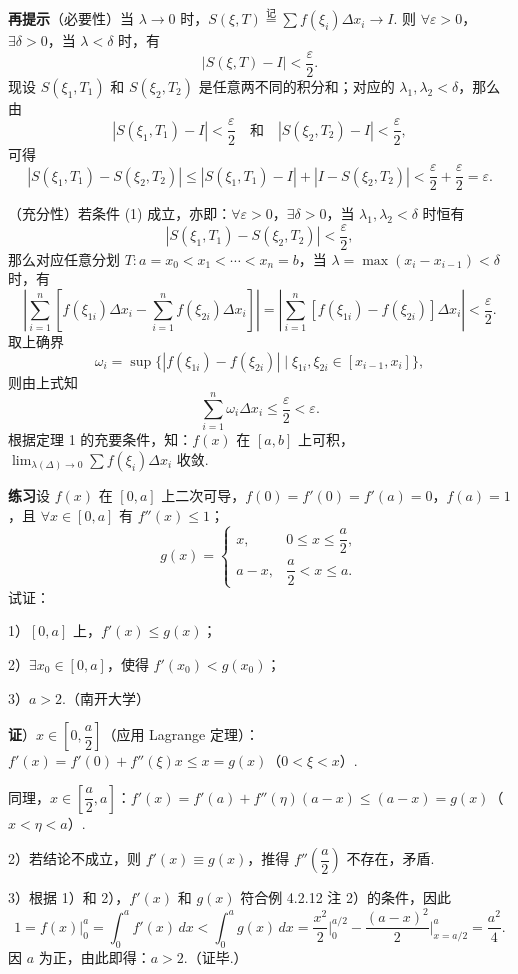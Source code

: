 \documentclass[UTF8,12pt,a4paper,fontset=fandol]{ctexart}
\begin{document}
\noindent\textbf{再提示}\quad （必要性）当 $\lambda\to0$ 时，$S(\xi,T)\stackrel{\text{记}}{=}\sum f(\xi_i)\Delta x_i\to I$. 则 $\forall\varepsilon>0$，$\exists\delta>0$，当 $\lambda<\delta$ 时，有
\[
|S(\xi,T)-I|<\frac{\varepsilon}{2}.
\]
现设 $S(\xi_1,T_1)$ 和 $S(\xi_2,T_2)$ 是任意两不同的积分和；对应的 $\lambda_1,\lambda_2<\delta$，那么由
\[
|S(\xi_1,T_1)-I|<\frac{\varepsilon}{2}\quad\text{和}\quad |S(\xi_2,T_2)-I|<\frac{\varepsilon}{2},
\]
可得
\[
|S(\xi_1,T_1)-S(\xi_2,T_2)|
\le |S(\xi_1,T_1)-I|+|I-S(\xi_2,T_2)|<\frac{\varepsilon}{2}+\frac{\varepsilon}{2}=\varepsilon.
\]

（充分性）若条件 (1) 成立，亦即：$\forall\varepsilon>0$，$\exists\delta>0$，当 $\lambda_1,\lambda_2<\delta$ 时恒有
\[
|S(\xi_1,T_1)-S(\xi_2,T_2)|<\frac{\varepsilon}{2},
\tag{2}
\]
那么对应任意分划 $T:a=x_0<x_1<\cdots<x_n=b$，当 $\lambda=\max(x_i-x_{i-1})<\delta$ 时，有
\[
\left|\sum_{i=1}^n[f(\xi_{1i})\Delta x_i-\sum_{i=1}^n f(\xi_{2i})\Delta x_i]\right|
=\left|\sum_{i=1}^n[f(\xi_{1i})-f(\xi_{2i})]\Delta x_i\right|<\frac{\varepsilon}{2}.
\]
取上确界
\[
\omega_i=\sup\{|f(\xi_{1i})-f(\xi_{2i})|\mid \xi_{1i},\xi_{2i}\in[x_{i-1},x_i]\},
\]
则由上式知
\[
\sum_{i=1}^n\omega_i\Delta x_i\le\frac{\varepsilon}{2}<\varepsilon.
\]
根据定理 1 的充要条件，知：$f(x)$ 在 $[a,b]$ 上可积，$\lim_{\lambda(\Delta)\to0}\sum f(\xi_i)\Delta x_i$ 收敛.

\noindent\textbf{练习}\quad 设 $f(x)$ 在 $[0,a]$ 上二次可导，$f(0)=f'(0)=f'(a)=0$，$f(a)=1$，且 $\forall x\in[0,a]$ 有 $f''(x)\le1$；
\[
g(x)=
\begin{cases}
x, & 0\le x\le\dfrac a2,\\
a-x, & \dfrac a2<x\le a.
\end{cases}
\]
试证：

1）$[0,a]$ 上，$f'(x)\le g(x)$；

2）$\exists x_0\in[0,a]$，使得 $f'(x_0)<g(x_0)$；

3）$a>2$.（南开大学）

\noindent\textbf{证}）$x\in\left[0,\dfrac a2\right]$（应用 Lagrange 定理）：$f'(x)=f'(0)+f''(\xi)x\le x=g(x)$（$0<\xi<x$）.

同理，$x\in\left[\dfrac a2,a\right]$：$f'(x)=f'(a)+f''(\eta)(a-x)\le(a-x)=g(x)$（$x<\eta<a$）.

2）若结论不成立，则 $f'(x)\equiv g(x)$，推得 $f''\left(\dfrac a2\right)$ 不存在，矛盾.

3）根据 1）和 2），$f'(x)$ 和 $g(x)$ 符合例 4.2.12 注 2）的条件，因此
\[
1=f(x)\bigg|_0^a=\int_0^a f'(x)\,dx<\int_0^a g(x)\,dx
=\frac{x^2}{2}\bigg|_0^{a/2}-\frac{(a-x)^2}{2}\bigg|_{x=a/2}^a
=\frac{a^2}{4}.
\]
因 $a$ 为正，由此即得：$a>2$.（证毕.）
\end{document}
